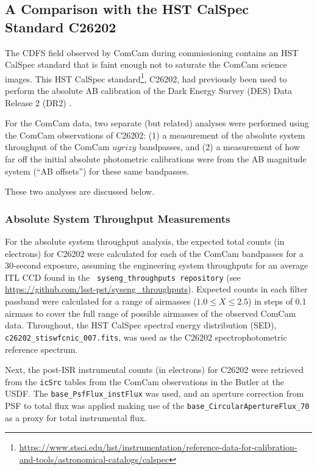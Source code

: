 \subsection{A Comparison with the HST CalSpec Standard C26202}

The CDFS field observed by ComCam during commissioning contains an HST
CalSpec standard that is faint enough not to saturate the ComCam
science images.  This HST CalSpec
standard\footnote{\url{https://www.stsci.edu/hst/instrumentation/reference-data-for-calibration-and-tools/astronomical-catalogs/calspec}},
C26202, had previously been used to perform the absolute AB
calibration of the Dark Energy Survey (DES) Data Release 2 (DR2)
\citep{2021ApJS..255...20A}.

For the ComCam data, two separate (but related) analyses were
performed using the ComCam observations of C26202: (1) a measurement
of the absolute system throughput of the ComCam $ugrizy$ bandpasses,
and (2) a measurement of how far off the initial absolute photometric
calibrations were from the AB magnitude system (``AB offsets'') for
these same bandpasses.

These two analyses are discussed below.

\subsubsection{Absolute System Throughput Measurements}

For the absolute system throughput analysis, the expected total counts
(in electrons) for C26202 were calculated for each of the ComCam
bandpasses for a 30-second exposure, assuming the engineering system
throughputs for an average ITL CCD found in the {\tt
  syseng\_throughputs repository} (see
\url{https://github.com/lsst-pst/syseng\_throughputs}). Expected
counts in each filter passband were calculated for a range of
airmasses ($1.0 \leq X \leq 2.5$) in steps of 0.1 airmass to cover the
full range of possible airmasses of the observed ComCam data.
Throughout, the HST CalSpec spectral energy distribution (SED), {\tt
  c26202\_stiswfcnic\_007.fits}, was used as the C26202
spectrophotometric reference spectrum.

Next, the post-ISR instrumental counts (in electrons) for C26202 were
retrieved from the {\tt icSrc} tables from the ComCam observations in
the Butler at the USDF.  The {\tt base\_PsfFlux\_instFlux} was used,
and an aperture correction from PSF to total flux was applied making
use of the {\tt base\_CircularApertureFlux\_70} as a proxy for total
instrumental flux.

